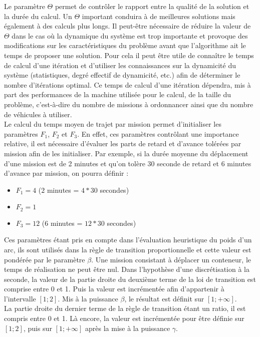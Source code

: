 Le paramètre $\Theta$ permet de contrôler le rapport entre la qualité de la solution et la durée du calcul. Un $\Theta$ important conduira à de meilleures solutions mais également à des calculs plus longs. Il peut-être nécessaire de réduire la valeur de $\Theta$ dans le cas où la dynamique du système est trop importante et provoque des modifications sur les caractéristiques du problème avant que l'algorithme ait le temps de proposer une solution. Pour cela il peut être utile de connaître le temps de calcul d'une itération et d'utiliser les connaissances sur la dynamicité du système (statistiques, degré effectif de dynamicité, etc.) afin de déterminer le nombre d'itérations optimal. Ce temps de calcul d'une itération dépendra, mis à part des performances de la machine utilisée pour le calcul, de la taille du problème, c'est-à-dire du nombre de missions à ordonnancer ainsi que du nombre de véhicules à utiliser.\\

Le calcul du temps moyen de trajet par mission permet d'initialiser les paramètres $F_1$, $F_2$ et $F_3$. En effet, ces paramètres contrôlant une importance relative, il est nécessaire d'évaluer les parts de retard et d'avance tolérées par mission afin de les initialiser. Par exemple, si la durée moyenne du déplacement d'une mission est de 2 minutes et qu'on tolère 30 seconde de retard et 6 minutes d'avance par mission, on pourra définir : 
\begin{itemize}
 \item $F_1 = 4$ ($2$ minutes = $4 * 30$ secondes)
 \item $F_2 = 1$ 
 \item $F_3 = 12$ ($6$ minutes = $12 * 30$ secondes)
\end{itemize}

Ces paramètres étant pris en compte dans l'évaluation heuristique du poids d'un arc, ils sont utilisés dans la règle de transition proportionnelle et cette valeur est pondérée par le paramètre $\beta$. Une mission consistant à déplacer un conteneur, le temps de réalisation ne peut être nul. Dans l'hypothèse d'une discrétisation à la seconde, la valeur de la partie droite du deuxième terme de la loi de transition est comprise entre 0 et 1. Puis la valeur est incrémentée afin d'appartenir à l'intervalle $\left[1;2\right]$. Mis à la puissance $\beta$, le résultat est définit sur $\left[1;+\infty\right]$.\\

La partie droite du dernier terme de la règle de transition étant un ratio, il est compris entre 0 et 1. Là encore, la valeur est incrémentée pour être définie sur $\left[1;2\right]$, puis sur $\left[1;+\infty\right]$ après la mise à la puissance $\gamma$.\\

